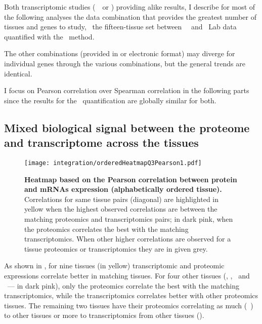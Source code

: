 Both transcriptomic studies (\uhlen\ \etal\ or \gtex)
providing alike results,
I describe for most of the following analyses the data combination
that provides the greatest number of tissues and genes to study,
\ie\ the fifteen-tissue set between \uhlen\ \etal\ and \pandey\ Lab data
quantified with the \PPKM\ method.\mybr\

\vspace{-1mm}
The other combinations
(provided in  or electronic format)
may diverge for individual genes through the various combinations,
but the general trends are identical.\mybr\
\vspace{-1mm}

I focus on Pearson correlation over Spearman correlation
in the following parts
since the results for the \PPKM\ quantification are globally similar for both.\mybr\

\subsection{Mixed biological signal between the proteome and transcriptome
across the tissues}
\begin{figure}[!hb]
    \texttt{[image: integration/orderedHeatmapQ3Pearson1.pdf]}\centering
    \vspace{-2mm}
    \caption[Heatmap based on the Pearson correlation between protein and mRNAs
    expression (alphabetically ordered tissue)]{\label{fig:orderedHeatmapPearson}%
    \textbf{Heatmap based on the Pearson correlation between protein and mRNAs
    expression (alphabetically ordered tissue).}
    Correlations for same tissue pairs (diagonal) are highlighted in
    yellow when the highest observed correlations are between the matching proteomics
    and transcriptomics pairs; in dark pink, when the proteomics correlates
    the best with the matching transcriptomics.
    When other higher correlations are observed for a tissue proteomics or transcriptomics
    they are in given grey.}
\end{figure}

As shown in ,
for nine tissues (in yellow) transcriptomic and proteomic expressions correlate
better in matching tissues.
For four other tissues (\hColon, \Lung, \Oesophagus\ and \Urinarybladder\
--- in dark pink),
only the proteomics correlate the best with the matching transcriptomics,
while the transcriptomics correlates better with other proteomics tissues.
The remaining two tissues have their proteomics correlating
as much (\eg\ \Gall) to other tissues or more to transcriptomics
from other tissues (\Rectum).\mybr\

